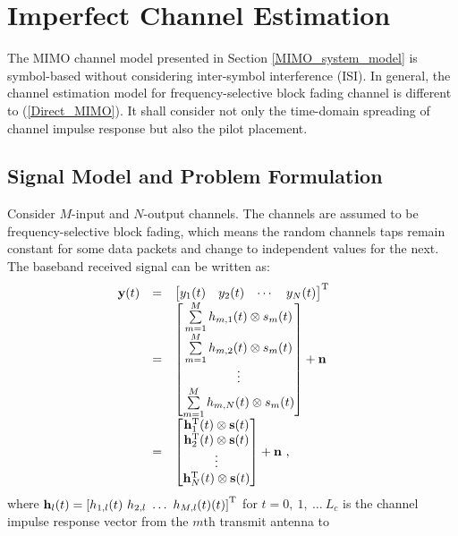 \documentclass[10pt,fleqn, twocolumn]{IEEEtran}
\newcommand{\bh}{{\bf h}}
\newcommand{\bH}{{\bf H}}
\newcommand{\bs}{{\bf s}}
\newcommand{\bn}{{\bf n}}
\newcommand{\by}{{\bf y}}
\begin{document}
\section{Imperfect Channel Estimation}
The MIMO channel model presented in Section
\ref{MIMO_system_model} is symbol-based without considering
inter-symbol interference (ISI). In general, the channel
estimation model for frequency-selective block fading channel is
different to (\ref{Direct_MIMO}). It shall consider not only the
time-domain spreading of channel impulse response but also the
pilot placement.

\subsection{Signal Model and Problem Formulation}
Consider $M$-input and $N$-output channels. The channels are
assumed to be frequency-selective block fading, which means the
random channels taps remain constant for some data packets and
change to independent values for the next. The baseband received
signal can be written as:
\begin{equation}\hspace{-0.20in}
\begin{array}{rcl}
\by(t)&=&\left[\begin{matrix}y_{1}(t)&y_{2}(t)&\cdots&y_{N}(t)\end{matrix}\right]^{\rm T}\\
&=&\left[\begin{matrix}\sum\limits_{m=1}^{M}h_{m,1}(t)\otimes s_m(t)\\ \sum\limits_{m=1}^{M}h_{m,2}(t)\otimes s_m(t)\\ \vdots \\
\sum\limits_{m=1}^{M}h_{m,N}(t)\otimes
s_m(t)\end{matrix}\right]+\bn\\
&=&\left[\begin{matrix}\bh_{1}^{\rm T}(t)\otimes \bs(t)\\ \bh_{2}^{\rm T}(t)\otimes \bs(t)\\ \vdots \\
\bh_{N}^{\rm T}(t)\otimes \bs(t)\end{matrix}\right]+\bn\ ,
\end{array}
\end{equation}
\noindent where $\bh_{l}(t)=\left[h_{1,l}(t)\ h_{2,l}\ \ldots\
h_{M,l}(t)(t)\right]^{\rm T}$ for $t=0,\ 1,\ \ldots\ L_{c}$ is the
channel impulse response vector from the $m$th transmit antenna to
\end{document}
